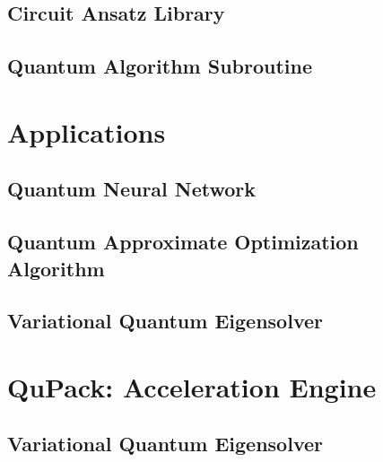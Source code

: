 \documentclass[pra,twocolumn,superscriptaddress,floatfix,nofootinbib,amsmath,amssymb]{revtex4-1}
\numberwithin{equation}{section}
\numberwithin{figure}{section}
\numberwithin{table}{section}
\begin{document}
\subsection{Circuit Ansatz Library}


\subsection{Quantum Algorithm Subroutine}



\section{Applications}
\label{sec:applications}
\subsection{Quantum Neural Network}








\subsection{Quantum Approximate Optimization Algorithm}


\subsection{Variational Quantum Eigensolver}





\section{QuPack: Acceleration Engine}
\label{sec:qupack}


\subsection{Variational Quantum Eigensolver}

\end{document}
